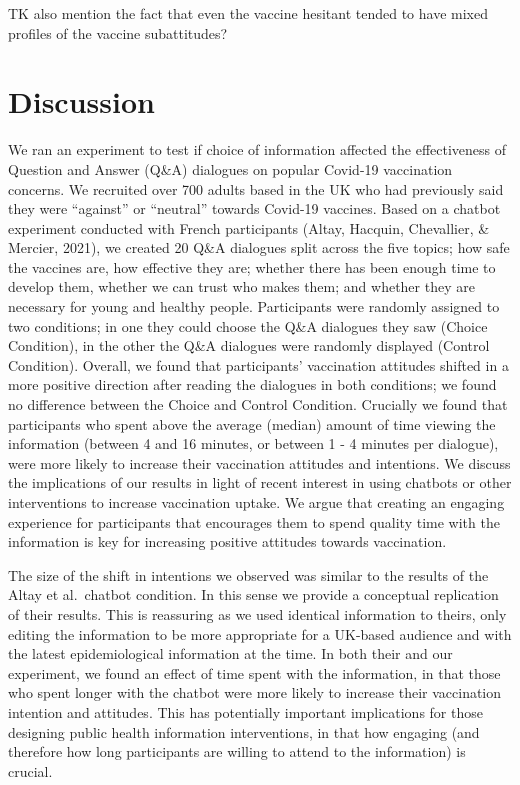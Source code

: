 \documentclass[
  english,
  ,jou,floatsintext]{apa6}
\begin{document}
TK also mention the fact that even the vaccine hesitant tended to have mixed profiles of the vaccine subattitudes?

\hypertarget{discussion}{%
\section{Discussion}\label{discussion}}

We ran an experiment to test if choice of information affected the effectiveness of Question and Answer (Q\&A) dialogues on popular Covid-19 vaccination concerns. We recruited over 700 adults based in the UK who had previously said they were ``against'' or ``neutral'' towards Covid-19 vaccines. Based on a chatbot experiment conducted with French participants (Altay, Hacquin, Chevallier, \& Mercier, 2021), we created 20 Q\&A dialogues split across the five topics; how safe the vaccines are, how effective they are; whether there has been enough time to develop them, whether we can trust who makes them; and whether they are necessary for young and healthy people. Participants were randomly assigned to two conditions; in one they could choose the Q\&A dialogues they saw (Choice Condition), in the other the Q\&A dialogues were randomly displayed (Control Condition). Overall, we found that participants' vaccination attitudes shifted in a more positive direction after reading the dialogues in both conditions; we found no difference between the Choice and Control Condition. Crucially we found that participants who spent above the average (median) amount of time viewing the information (between 4 and 16 minutes, or between 1 - 4 minutes per dialogue), were more likely to increase their vaccination attitudes and intentions. We discuss the implications of our results in light of recent interest in using chatbots or other interventions to increase vaccination uptake. We argue that creating an engaging experience for participants that encourages them to spend quality time with the information is key for increasing positive attitudes towards vaccination.

The size of the shift in intentions we observed was similar to the results of the Altay et al.~chatbot condition. In this sense we provide a conceptual replication of their results. This is reassuring as we used identical information to theirs, only editing the information to be more appropriate for a UK-based audience and with the latest epidemiological information at the time. In both their and our experiment, we found an effect of time spent with the information, in that those who spent longer with the chatbot were more likely to increase their vaccination intention and attitudes. This has potentially important implications for those designing public health information interventions, in that how engaging (and therefore how long participants are willing to attend to the information) is crucial.
\end{document}
